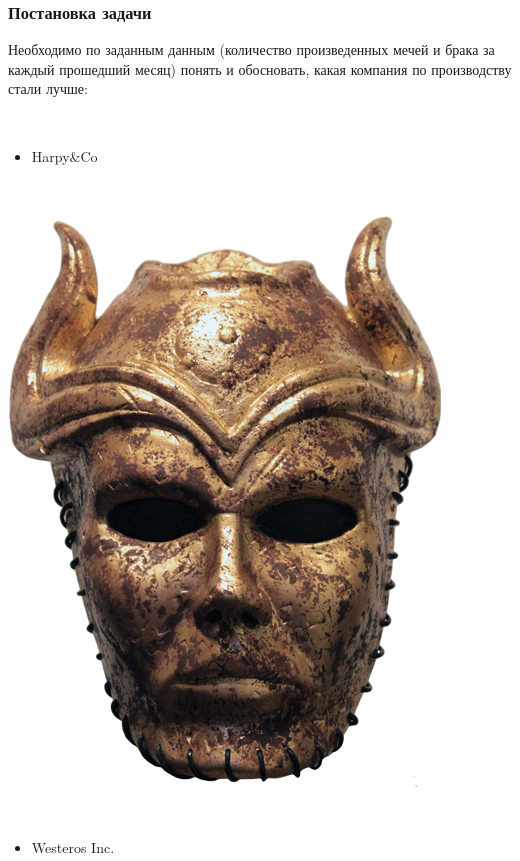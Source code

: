 \documentclass{beamer}
\begin{document}
\begin{frame}
  \frametitle{Постановка задачи}

    Необходимо по заданным данным (количество произведенных мечей и брака за каждый прошедший месяц) понять и обосновать, какая компания по производству стали лучше:
    
    \
    
    \begin{minipage}{0.3\textwidth}
        \begin{itemize}
            \item Harpy\&Co
        \end{itemize}
        
        \hspace{20pt}
        \includegraphics[scale = 0.1]{game_of_thrones_son_of_the_harpy.png}
    \end{minipage}
    \begin{minipage}{0.3\textwidth}
        \begin{itemize}
            \item Westeros Inc.
        \end{itemize}
        

\end{minipage}
\end{frame}
\end{document}
